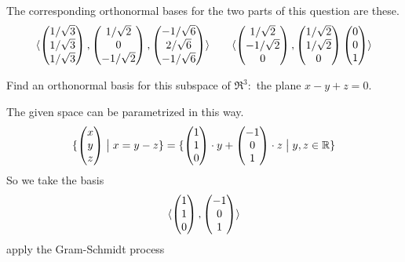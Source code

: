 \begin{exercises}
\begin{answer}
\begin{exparts}
\begin{align*}
        \end{align*}
      \end{exparts}
      The corresponding orthonormal bases for the two parts of this
      question are these.
      \begin{equation*}
        \langle
              \begin{pmatrix} 1/\sqrt{3} \\ 1/\sqrt{3} \\ 1/\sqrt{3} \end{pmatrix},
              \begin{pmatrix} 1/\sqrt{2} \\ 0 \\ -1/\sqrt{2} \end{pmatrix},
              \begin{pmatrix} -1/\sqrt{6} \\ 2/\sqrt{6} \\ -1/\sqrt{6} \end{pmatrix}
              \rangle
        \qquad
        \langle
              \begin{pmatrix} 1/\sqrt{2} \\ -1/\sqrt{2} \\ 0 \end{pmatrix},
              \begin{pmatrix} 1/\sqrt{2} \\ 1/\sqrt{2} \\ 0 \end{pmatrix}
              \begin{pmatrix} 0 \\ 0 \\ 1 \end{pmatrix}
              \rangle
      \end{equation*}
    \end{answer}
   \recommended \item 
       Find an orthonormal basis for this subspace of $\Re^3$:~the
       plane $x-y+z=0$.
       \begin{answer}
         The given space can be parametrized in this way.
         \begin{equation*}
           \mbox{$\{\begin{pmatrix} x \\ y \\ z \end{pmatrix} \bigm| x=y-z\}$}
           =\mbox{$\{\begin{pmatrix} 1 \\ 1 \\ 0 \end{pmatrix}\cdot y+\begin{pmatrix} -1 \\ 0 \\ 1 \end{pmatrix}\cdot z 
                     \bigm| y,z\in\mathbb{R}\}$}
         \end{equation*}
         So we take the basis
         \begin{equation*}
           \langle\begin{pmatrix} 1 \\ 1 \\ 0 \end{pmatrix},
                     \begin{pmatrix} -1 \\ 0 \\ 1 \end{pmatrix}\rangle
         \end{equation*}
         apply the Gram-Schmidt process
         \begin{align*}

\end{align*}
\end{answer}
\end{exercises}

